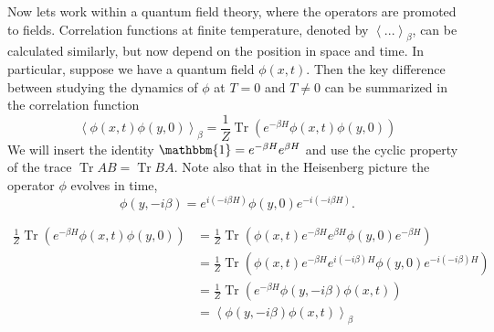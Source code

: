 \documentclass[%
 reprint,
nofootinbib,
 amsmath,amssymb,
 aps,
floatfix,
]{revtex4-1}
\DeclareMathOperator{\Tr}{Tr}
\begin{document}
Now lets work within a quantum field theory, where the operators are promoted to fields.
Correlation functions at finite temperature, denoted by $\left<...\right>_\beta$, can be calculated similarly, but now depend on the position in space and time.
In particular, suppose we have a quantum field $\phi(x, t)$.
Then the key difference between studying the dynamics of $\phi$ at $T=0$ and $T\neq 0$ can be summarized in the correlation function \cite{yang11}
\begin{equation}
    \left<\phi(x,t)\phi(y,0)\right>_\beta = \frac{1}{Z} \Tr \left(e^{-\beta H}\phi(x,t)\phi(y,0)\right)
\end{equation}
We will insert the identity $\mathbbm{1}=e^{-\beta H}e^{\beta H}$ and use the cyclic property of the trace $\Tr AB = \Tr BA$.
Note also that in the Heisenberg picture the operator $\phi$ evolves in time,
\begin{equation}
    \phi(y,-i\beta) = e^{i\left(-i\beta H\right)}\phi(y,0)e^{-i\left(-i\beta H\right)}.
\end{equation}

\begin{widetext}
\begin{equation}
\begin{split}
    \frac{1}{Z} \Tr \left(e^{-\beta H}\phi(x,t)\phi(y,0)\right) &= \frac{1}{Z} \Tr \left(\phi(x,t)e^{-\beta H}e^{\beta H}\phi(y,0)e^{-\beta H}\right) \\
    &= \frac{1}{Z} \Tr \left(\phi(x,t)e^{-\beta H} e^{i(-i\beta)H} \phi(y, 0)e^{-i(-i\beta)H}\right) \\
    &= \frac{1}{Z} \Tr \left(e^{-\beta H} \phi(y, -i\beta) \phi(x,t)\right) \\
    &= \left<\phi(y, -i\beta)\phi(x, t)\right>_\beta
\end{split}
\end{equation}
\end{widetext}
\end{document}

